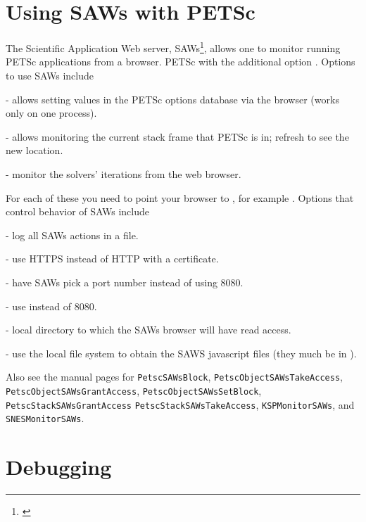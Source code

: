 {{\section{Using SAWs with PETSc} \label{sec_saws}
The Scientific Application Web server, 
SAWs\footnote{\href{https://bitbucket.org/saws/saws/wiki/Home}{}},
allows one to monitor running PETSc applications from a browser.
 PETSc with the additional option . 
Options to use SAWs include
\begin{tightitemize}
  \item{} - allows setting values in the PETSc options database via the browser (works only on one process).
  \item{} - allows monitoring the current stack frame that PETSc is in; refresh to see the new location.
  \item{} - monitor the solvers' iterations from the web browser.
\end{tightitemize}
For each of these you need to point your browser to , for example .
Options that control behavior of SAWs include
\begin{tightitemize}
  \item{} - log all SAWs actions in a file.
  \item{} - use HTTPS instead of HTTP with a certificate.
  \item{} - have SAWs pick a port number instead of using 8080.
  \item{} - use  instead of 8080.
  \item{} - local directory to which the SAWs browser will have read access.
  \item{} - use the local file system to obtain the SAWS javascript files (they much be in ).
\end{tightitemize}
Also see the manual pages for \lstinline{PetscSAWsBlock}, \lstinline{PetscObjectSAWsTakeAccess},
\lstinline{PetscObjectSAWsGrantAccess}, \lstinline{PetscObjectSAWsSetBlock}, \lstinline{PetscStackSAWsGrantAccess}
\lstinline{PetscStackSAWsTakeAccess}, \lstinline{KSPMonitorSAWs}, and \lstinline{SNESMonitorSAWs}.

\section{Debugging}  \label{sec_debugging}

}}
